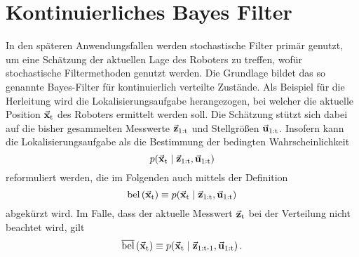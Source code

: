 \section{Kontinuierliches Bayes Filter}
In den späteren Anwendungsfallen werden stochastische Filter primär genutzt, um eine Schätzung der aktuellen Lage des Roboters zu treffen, wofür stochastische Filtermethoden genutzt werden. Die Grundlage bildet das so genannte Bayes-Filter für kontinuierlich verteilte Zustände. Als Beispiel für die Herleitung wird die Lokalisierungsaufgabe herangezogen, bei welcher die aktuelle Position $\vec{\mathbf{x}}_{\text{t}}$ des Roboters ermittelt werden soll. Die Schätzung stützt sich dabei auf die bisher gesammelten Messwerte $\vec{\mathbf{z}}_{\text{1:t}}$ und Stellgrößen $\vec{\mathbf{u}}_{\text{1:t}}$. Insofern kann die Lokalisierungsaufgabe als die Bestimmung der bedingten Wahrscheinlichkeit
\begin{equation}
p({\vec{\mathbf{x}}_{\text{t}}} \hspace{1mm} \vert \hspace{1mm} {\vec{\mathbf{z}}_{\text{1:t}},\vec{\mathbf{u}}_{\text{1:t}}})
\end{equation}
reformuliert werden, die im Folgenden auch mittels der Definition
\begin{equation}
\text{bel}\left({\vec{\mathbf{x}}_{\text{t}}}\right) \equiv p({\vec{\mathbf{x}}_{\text{t}}} \hspace{1mm} \vert \hspace{1mm} {\vec{\mathbf{z}}_{\text{1:t}},\vec{\mathbf{u}}_{\text{1:t}}})
\end{equation}
abgekürzt wird. Im Falle, dass der aktuelle Messwert $\vec{\mathbf{z}}_{\text{t}}$ bei der Verteilung nicht beachtet wird, gilt
\begin{equation}
\overline{\text{bel}}\left({\vec{\mathbf{x}}_{\text{t}}}\right) \equiv p({\vec{\mathbf{x}}_{\text{t}}} \hspace{1mm} \vert \hspace{1mm} {\vec{\mathbf{z}}_{\text{1:t-1}},\vec{\mathbf{u}}_{\text{1:t}}})\,.
\end{equation}